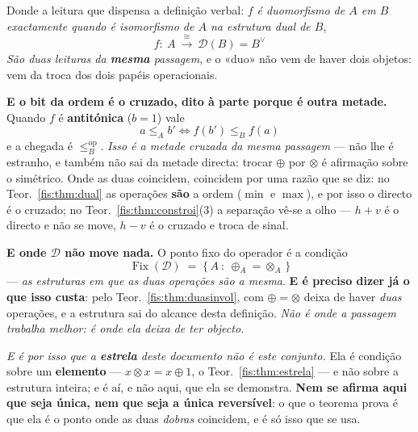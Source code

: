 \documentclass[livro.tex]{subfiles}
\begin{document}
\begin{definicao}
Donde a leitura que dispensa a definição verbal: \emph{$f$ é duomorfismo de $A$
em $B$ exactamente quando é isomorfismo de $A$ na estrutura dual de $B$},
\[
\boxed{\;f\colon\ A\ \xrightarrow{\ \cong\ }\ \mathcal{D}(B)=B^{\vee}\;}
\]
\emph{São duas leituras da \textbf{mesma} passagem}, e o «duo» não vem de haver
dois objetos: vem da troca dos dois papéis operacionais.


\medskip\noindent\textbf{E o bit da ordem é o cruzado, dito à parte porque é
outra metade.} Quando $f$ é \textbf{antitónica} ($b=1$) vale
\[
\boxed{\;a\le_A b'\iff f(b')\le_B f(a)\;}
\]
e a chegada é $\le_B^{\mathrm{op}}$. \emph{Isso é a metade cruzada da mesma
passagem} --- não lhe é estranho, e também não sai da metade directa: trocar
$\oplus$ por $\otimes$ é afirmação sobre o simétrico. Onde as duas coincidem,
coincidem por uma razão que se diz: no Teor.~\ref{fis:thm:dual} as operações
\textbf{são} a ordem ($\min$ e $\max$), e por isso o directo é o cruzado; no
Teor.~\ref{fis:thm:constroi}(3) a separação vê-se a olho --- $h+v$ é o directo e
não se move, $h-v$ é o cruzado e troca de sinal.

\medskip\noindent\textbf{E onde $\mathcal{D}$ não move nada.} O ponto fixo do
operador é a condição
\[
\boxed{\;\operatorname{Fix}(\mathcal{D})\;=\;\{\,A\ :\ \oplus_A=\otimes_A\,\}\;}
\]
--- \emph{as estruturas em que as duas operações são a mesma}. \textbf{E é
preciso dizer já o que isso custa}: pelo Teor.~\ref{fis:thm:duasinvol}, com
$\oplus=\otimes$ deixa de haver \emph{duas} operações, e a estrutura sai do
alcance desta definição. \emph{Não é onde a passagem trabalha melhor: é onde ela
deixa de ter objecto.}

\medskip\noindent\emph{E é por isso que a \textbf{estrela} deste documento não é
este conjunto.} Ela é condição sobre um \textbf{elemento} --- $x\otimes x=x\oplus1$,
o Teor.~\ref{fis:thm:estrela} --- e não sobre a estrutura inteira; e é aí, e não
aqui, que ela se demonstra. \textbf{Nem se afirma aqui que seja única, nem que
seja a única reversível}: o que o teorema prova é que ela é o ponto onde as duas
\emph{dobras} coincidem, e é só isso que se usa.
\end{definicao}
\end{document}
